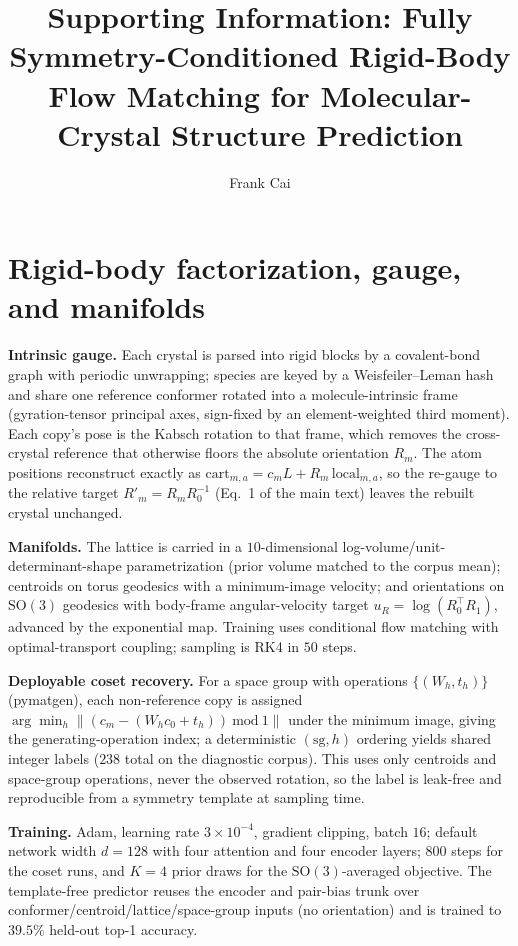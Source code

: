 \documentclass[journal=acsodf,manuscript=article]{achemso}
\author{Frank Cai}
\affiliation{Purdue University, West Lafayette, Indiana 47907, United States}
\title{Supporting Information:
Fully Symmetry-Conditioned Rigid-Body Flow Matching for
Molecular-Crystal Structure Prediction}
\begin{document}
\section{Rigid-body factorization, gauge, and manifolds}\label{sisec:method}
\textbf{Intrinsic gauge.} Each crystal is parsed into rigid blocks by a
covalent-bond graph with periodic unwrapping; species are keyed by a
Weisfeiler--Leman hash and share one reference conformer rotated into a
molecule-intrinsic frame (gyration-tensor principal axes, sign-fixed by an
element-weighted third moment). Each copy's pose is the Kabsch rotation to that
frame, which removes the cross-crystal reference that otherwise floors the absolute
orientation $R_m$. The atom positions reconstruct exactly as
$\text{cart}_{m,a}=c_mL+R_m\,\text{local}_{m,a}$, so the re-gauge to the relative
target $R'_m=R_mR_0^{-1}$ (Eq.~1 of the main text) leaves the rebuilt crystal
unchanged.

\textbf{Manifolds.} The lattice is carried in a $10$-dimensional
log-volume/unit-determinant-shape parametrization (prior volume matched to the
corpus mean); centroids on torus geodesics with a minimum-image velocity; and
orientations on $\mathrm{SO}(3)$ geodesics with body-frame angular-velocity target
$u_R=\log(R_0^\top R_1)$, advanced by the exponential map. Training uses conditional
flow matching\cite{lipman2023flowmatching} with optimal-transport
coupling\cite{pooladian2023multisample}; sampling is RK4 in $50$ steps.

\textbf{Deployable coset recovery.} For a space group with operations
$\{(W_h,t_h)\}$ (pymatgen), each non-reference copy is assigned
$\arg\min_h \lVert (c_m-(W_hc_0+t_h))\ \mathrm{mod}\ 1\rVert$ under the minimum
image, giving the generating-operation index; a deterministic $(\text{sg},h)$
ordering yields shared integer labels ($238$ total on the diagnostic corpus). This
uses only centroids and space-group operations, never the observed rotation, so the
label is leak-free and reproducible from a symmetry template at sampling time.

\textbf{Training.} Adam, learning rate $3\times10^{-4}$, gradient clipping, batch
$16$; default network width $d{=}128$ with four attention and four encoder layers;
$800$ steps for the coset runs, and $K{=}4$ prior draws for the
$\mathrm{SO}(3)$-averaged objective. The template-free predictor reuses the encoder
and pair-bias trunk over conformer/centroid/lattice/space-group inputs (no
orientation) and is trained to $39.5\%$ held-out top-1 accuracy.
\end{document}
